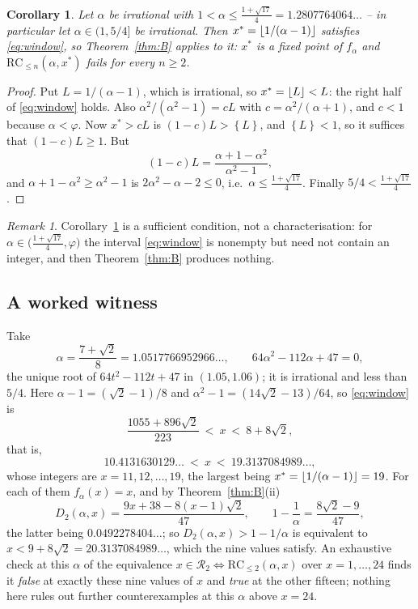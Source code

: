 \documentclass[11pt]{amsart}
\newtheorem{corollary}[theorem]{Corollary}
\theoremstyle{remark}
\newtheorem*{remark}{Remark}
\DeclarePairedDelimiter{\fl}{\lfloor}{\rfloor}
\newcommand{\fp}[1]{\left\{#1\right\}}
\newcommand{\RC}{\mathrm{RC}}
\begin{document}
\begin{corollary}\label{cor:B}
Let $\alpha$ be irrational with $1<\alpha\le\frac{1+\sqrt{17}}4=1.2807764064\ldots$ --
in particular let $\alpha\in(1,5/4]$ be irrational. Then
$x^{*}=\fl{1/(\alpha-1)}$ satisfies \eqref{eq:window}, so
Theorem~\ref{thm:B} applies to it: $x^{*}$ is a fixed point of $f_\alpha$ and
$\RC_{\le n}(\alpha,x^{*})$ fails for every $n\ge2$.
\end{corollary}

\begin{proof}
Put $L=1/(\alpha-1)$, which is irrational, so $x^{*}=\fl L<L$: the right half of
\eqref{eq:window} holds. Also
$\alpha^{2}/(\alpha^{2}-1)=cL$ with $c=\alpha^{2}/(\alpha+1)$, and $c<1$ because
$\alpha<\varphi$. Now $x^{*}>cL$ is $(1-c)L>\fp L$, and $\fp L<1$, so it suffices that
$(1-c)L\ge1$. But
\[
 (1-c)L=\frac{\alpha+1-\alpha^{2}}{\alpha^{2}-1},
\]
and $\alpha+1-\alpha^{2}\ge\alpha^{2}-1$ is $2\alpha^{2}-\alpha-2\le0$, i.e.\
$\alpha\le\frac{1+\sqrt{17}}4$. Finally $5/4<\frac{1+\sqrt{17}}4$.
\end{proof}

\begin{remark}
Corollary~\ref{cor:B} is a sufficient condition, not a characterisation: for
$\alpha\in\bigl(\frac{1+\sqrt{17}}4,\varphi\bigr)$ the interval \eqref{eq:window} is
nonempty but need not contain an integer, and then Theorem~\ref{thm:B} produces nothing.
\end{remark}

\subsection*{A worked witness}
Take
\[
 \alpha=\frac{7+\sqrt2}8=1.0517766952966\ldots,
 \qquad 64\alpha^{2}-112\alpha+47=0,
\]
the unique root of $64t^{2}-112t+47$
in $(1.05,1.06)$; it is irrational and less than $5/4$. Here $\alpha-1=(\sqrt2-1)/8$ and
$\alpha^{2}-1=(14\sqrt2-13)/64$, so \eqref{eq:window} is
\[
 \frac{1055+896\sqrt2}{223}\ <\ x\ <\ 8+8\sqrt2,
\]
that is,
\[
 10.4131630129\ldots\ <\ x\ <\ 19.3137084989\ldots,
\]
whose integers are $x=11,12,\dots,19$, the largest being
$x^{*}=\fl{1/(\alpha-1)}=19$. For each of them $f_\alpha(x)=x$, and by
Theorem~\ref{thm:B}(ii)
\[
 D_2(\alpha,x)=\frac{9x+38-8(x-1)\sqrt2}{47},
 \qquad
 1-\frac1\alpha=\frac{8\sqrt2-9}{47},
\]
the latter being $0.0492278404\ldots$;
so $D_2(\alpha,x)>1-1/\alpha$ is equivalent to $x<9+8\sqrt2=20.3137084989\ldots$, which
the nine values satisfy. An exhaustive check at this $\alpha$ of the equivalence
$x\in\mathcal R_2\Leftrightarrow\RC_{\le2}(\alpha,x)$ over $x=1,\dots,24$ finds it
\emph{false} at exactly these nine values of $x$ and \emph{true} at the other fifteen;
nothing here rules out further counterexamples at this $\alpha$ above $x=24$.
\end{document}
